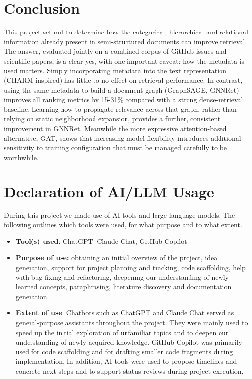 \documentclass[11pt]{article}
\begin{document}
\section{Conclusion}
\label{sec:conclusion}
This project set out to determine how the categorical, hierarchical and relational information already present in semi-structured documents can improve retrieval. The answer, evaluated jointly on a combined corpus of GitHub issues and scientific papers, is a clear yes, with one important caveat: how the metadata is used matters. Simply incorporating metadata into the text representation (CHARM-inspired) has little to no effect on retrieval performance. In contrast, using the same metadata to build a document graph (GraphSAGE, GNNRet) improves all ranking metrics by 15-31\% compared with a strong dense-retrieval baseline. Learning how to propagate relevance across that graph, rather than relying on static neighborhood expansion, provides a further, consistent improvement in GNNRet. Meanwhile the more expressive attention-based alternative, GAT, shows that increasing model flexibility introduces additional sensitivity to training configuration that must be managed carefully to be worthwhile.

\section*{Declaration of AI/LLM Usage}

During this project we made use of AI tools and large language models. The following outlines which tools were used, for what purpose and to what extent.

\begin{itemize}
  \item \textbf{Tool(s) used:} ChatGPT, Claude Chat, GitHub Copilot
  \item \textbf{Purpose of use:} obtaining an initial overview of the project, idea generation, support for project planning and tracking, code scaffolding, help with bug fixing and refactoring, deepening our understanding of newly learned concepts, paraphrasing, literature discovery and documentation generation.
  \item \textbf{Extent of use:} Chatbots such as ChatGPT and Claude Chat served as general-purpose assistants throughout the project. They were mainly used to speed up the initial exploration of unfamiliar topics and to deepen our understanding of newly acquired knowledge. GitHub Copilot was primarily used for code scaffolding and for drafting smaller code fragments during implementation. In addition, AI tools were used to propose timelines and concrete next steps and to support status reviews during project execution.
\end{itemize}
\end{document}
